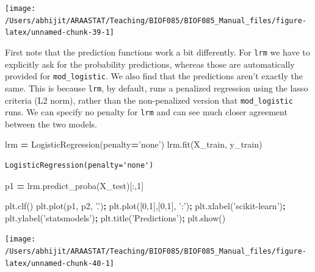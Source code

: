 \documentclass[
  letterpaper,
]{scrbook}
\newenvironment{Shaded}{\begin{snugshade}}{\end{snugshade}}
\newcommand{\DecValTok}[1]{\textcolor[rgb]{0.00,0.00,0.81}{#1}}
\newcommand{\NormalTok}[1]{#1}
\newcommand{\OperatorTok}[1]{\textcolor[rgb]{0.81,0.36,0.00}{\textbf{#1}}}
\newcommand{\StringTok}[1]{\textcolor[rgb]{0.31,0.60,0.02}{#1}}
\begin{document}
\begin{center}\texttt{[image: /Users/abhijit/ARAASTAT/Teaching/BIOF085/BIOF085\_Manual\_files/figure-latex/unnamed-chunk-39-1]} \end{center}

First note that the prediction functions work a bit differently. For \texttt{lrm} we have to explicitly ask for the probability predictions, whereas those are automatically provided for \texttt{mod\_logistic}. We also find that the predictions aren't exactly the same. This is because \texttt{lrm}, by default, runs a penalized regression using the lasso criteria (L2 norm), rather than the non-penalized version that \texttt{mod\_logistic} runs. We can specify no penalty for \texttt{lrm} and can see much closer agreement between the two models.

\begin{Shaded}
\begin{Highlighting}[]
\NormalTok{lrm }\OperatorTok{=}\NormalTok{ LogisticRegression(penalty}\OperatorTok{=}\StringTok{'none'}\NormalTok{)}
\NormalTok{lrm.fit(X_train, y_train)}
\end{Highlighting}
\end{Shaded}

\begin{verbatim}
LogisticRegression(penalty='none')
\end{verbatim}

\begin{Shaded}
\begin{Highlighting}[]
\NormalTok{p1 }\OperatorTok{=}\NormalTok{ lrm.predict_proba(X_test)[:,}\DecValTok{1}\NormalTok{]}

\NormalTok{plt.clf()}
\NormalTok{plt.plot(p1, p2, }\StringTok{'.'}\NormalTok{)}\OperatorTok{;}
\NormalTok{plt.plot([}\DecValTok{0}\NormalTok{,}\DecValTok{1}\NormalTok{],[}\DecValTok{0}\NormalTok{,}\DecValTok{1}\NormalTok{], }\StringTok{':'}\NormalTok{)}\OperatorTok{;}
\NormalTok{plt.xlabel(}\StringTok{'scikit-learn'}\NormalTok{)}\OperatorTok{;}
\NormalTok{plt.ylabel(}\StringTok{'statsmodels'}\NormalTok{)}\OperatorTok{;}
\NormalTok{plt.title(}\StringTok{'Predictions'}\NormalTok{)}\OperatorTok{;}
\NormalTok{plt.show()}
\end{Highlighting}
\end{Shaded}

\begin{center}\texttt{[image: /Users/abhijit/ARAASTAT/Teaching/BIOF085/BIOF085\_Manual\_files/figure-latex/unnamed-chunk-40-1]} \end{center}
\end{document}
